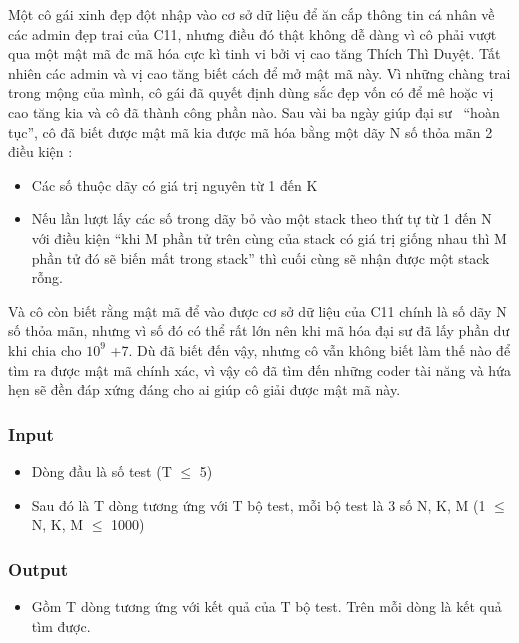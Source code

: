



   Một cô gái xinh đẹp đột nhập vào cơ sở dữ liệu để ăn cắp thông tin cá nhân về các admin đẹp trai của C11, nhưng điều đó thật không dễ dàng vì cô phải vượt qua một mật mã đc mã hóa cực kì tinh vi bởi vị cao tăng Thích Thì Duyệt. Tất nhiên các admin và vị cao tăng biết cách để mở mật mã này. Vì những chàng trai trong mộng của mình, cô gái đã quyết định dùng sắc đẹp vốn có để mê hoặc vị cao tăng kia và cô đã thành công phần nào. Sau vài ba ngày giúp đại sư  “hoàn tục”, cô đã biết được mật mã kia được mã hóa bằng một dãy N số thỏa mãn 2 điều kiện :  
\begin{itemize}
	\item     Các số thuộc dãy có giá trị nguyên từ 1 đến K   
	\item     Nếu lần lượt lấy các số trong dãy bỏ vào một stack theo thứ tự từ 1 đến N  với điều kiện “khi M phần tử trên cùng của stack có giá trị giống nhau  thì M phần tử đó sẽ biến mất trong stack” thì cuối cùng sẽ nhận được một  stack rỗng.   
\end{itemize}

   Và cô còn biết rằng mật mã để vào được cơ sở dữ liệu của C11 chính là số dãy N số thỏa mãn, nhưng vì số đó có thể rất lớn nên khi mã hóa đại sư đã lấy phần dư khi chia cho $10^{9}$   +7. Dù đã biết đến vậy, nhưng cô vẫn không biết làm thế nào để tìm ra được mật mã chính xác, vì vậy cô đã tìm đến những coder tài năng và hứa hẹn sẽ đền đáp xứng đáng cho ai giúp cô giải được mật mã này.  

\subsubsection{   Input  }
\begin{itemize}
	\item     Dòng đầu là số test (T  $\le$  5)   
	\item     Sau đó là T dòng tương ứng với T bộ test, mỗi bộ test là 3 số N, K, M (1  $\le$  N, K, M  $\le$  1000)   
\end{itemize}

\subsubsection{   Output  }
\begin{itemize}
	\item     Gồm T dòng tương ứng với kết quả của T bộ test. Trên mỗi dòng là kết quả tìm được.   
\end{itemize}

